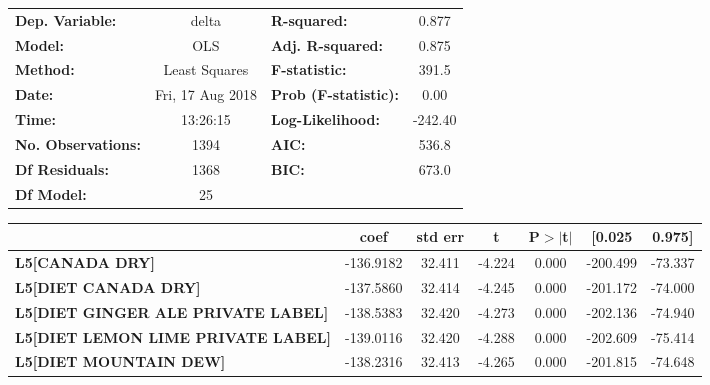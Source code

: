 \begin{center}
\begin{tabular}{lclc}
\toprule
\textbf{Dep. Variable:}                    &      delta       & \textbf{  R-squared:         } &     0.877   \\
\textbf{Model:}                            &       OLS        & \textbf{  Adj. R-squared:    } &     0.875   \\
\textbf{Method:}                           &  Least Squares   & \textbf{  F-statistic:       } &     391.5   \\
\textbf{Date:}                             & Fri, 17 Aug 2018 & \textbf{  Prob (F-statistic):} &     0.00    \\
\textbf{Time:}                             &     13:26:15     & \textbf{  Log-Likelihood:    } &   -242.40   \\
\textbf{No. Observations:}                 &        1394      & \textbf{  AIC:               } &     536.8   \\
\textbf{Df Residuals:}                     &        1368      & \textbf{  BIC:               } &     673.0   \\
\textbf{Df Model:}                         &          25      & \textbf{                     } &             \\
\bottomrule
\end{tabular}
\begin{tabular}{lcccccc}
                                           & \textbf{coef} & \textbf{std err} & \textbf{t} & \textbf{P$>$$|$t$|$} & \textbf{[0.025} & \textbf{0.975]}  \\
\midrule
\textbf{L5[CANADA DRY]}                    &    -136.9182  &       32.411     &    -4.224  &         0.000        &     -200.499    &      -73.337     \\
\textbf{L5[DIET CANADA DRY]}               &    -137.5860  &       32.414     &    -4.245  &         0.000        &     -201.172    &      -74.000     \\
\textbf{L5[DIET GINGER ALE PRIVATE LABEL]} &    -138.5383  &       32.420     &    -4.273  &         0.000        &     -202.136    &      -74.940     \\
\textbf{L5[DIET LEMON LIME PRIVATE LABEL]} &    -139.0116  &       32.420     &    -4.288  &         0.000        &     -202.609    &      -75.414     \\
\textbf{L5[DIET MOUNTAIN DEW]}             &    -138.2316  &       32.413     &    -4.265  &         0.000        &     -201.815    &      -74.648     \\

\end{tabular}
\end{center}
